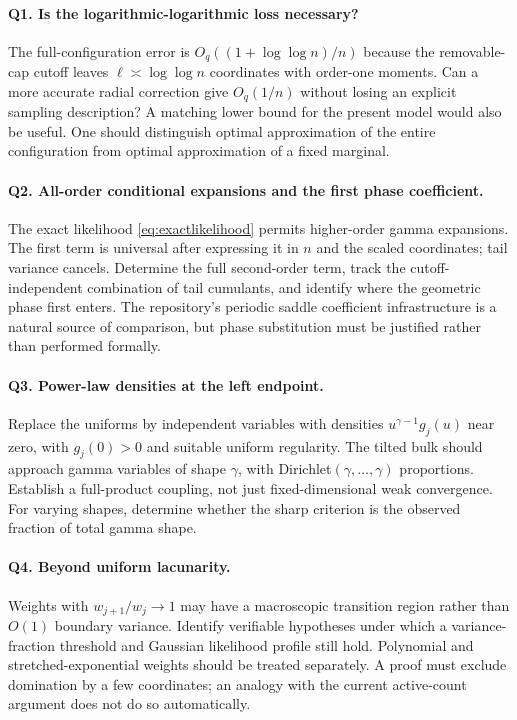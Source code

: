 \documentclass[11pt,letterpaper]{article}
\numberwithin{equation}{section}
\theoremstyle{definition}
\theoremstyle{remark}
\begin{document}
\paragraph{Q1. Is the logarithmic-logarithmic loss necessary?}
The full-configuration error is $O_q((1+\log\log n)/n)$ because the removable-cap
cutoff leaves $\ell\asymp\log\log n$ coordinates with order-one moments.
Can a more accurate radial correction give $O_q(1/n)$ without losing an
explicit sampling description? A matching lower bound for the present model
would also be useful. One should distinguish optimal approximation of the
entire configuration from optimal approximation of a fixed marginal.

\paragraph{Q2. All-order conditional expansions and the first phase coefficient.}
The exact likelihood \eqref{eq:exactlikelihood} permits higher-order gamma
expansions. The first term is universal after expressing it in $n$ and the
scaled coordinates; tail variance cancels. Determine the full second-order
term, track the cutoff-independent combination of tail cumulants, and identify
where the geometric phase first enters. The repository's periodic saddle
coefficient infrastructure is a natural source of comparison, but phase
substitution must be justified rather than performed formally.

\paragraph{Q3. Power-law densities at the left endpoint.}
Replace the uniforms by independent variables with densities
$u^{\gamma-1}g_j(u)$ near zero, with $g_j(0)>0$ and suitable uniform regularity.
The tilted bulk should approach gamma variables of shape $\gamma$, with
Dirichlet$(\gamma,\ldots,\gamma)$ proportions. Establish a full-product coupling,
not just fixed-dimensional weak convergence. For varying shapes, determine
whether the sharp criterion is the observed fraction of total gamma shape.

\paragraph{Q4. Beyond uniform lacunarity.}
Weights with $w_{j+1}/w_j\to1$ may have a macroscopic transition region rather
than $O(1)$ boundary variance. Identify verifiable hypotheses under which a
variance-fraction threshold and Gaussian likelihood profile still hold.
Polynomial and stretched-exponential weights should be treated separately.
A proof must exclude domination by a few coordinates; an analogy with the
current active-count argument does not do so automatically.
\end{document}
